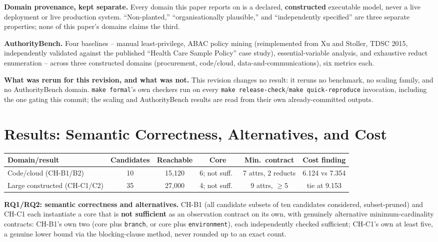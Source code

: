 \documentclass[11pt,a4paper]{article}
\theoremstyle{definition}
\begin{document}
\noindent\textbf{Domain provenance, kept separate.} Every domain this paper reports on is a declared, \textbf{constructed} executable model, never a live deployment or live production system. ``Non-planted,'' ``organisationally plausible,'' and ``independently specified'' are three separate properties; none of this paper's domains claims the third.

\noindent\textbf{AuthorityBench.} Four baselines -- manual least-privilege, ABAC policy mining (reimplemented from Xu and Stoller, TDSC 2015, independently validated against the published ``Health Care Sample Policy'' case study), essential-variable analysis, and exhaustive reduct enumeration -- across three constructed domains (procurement, code/cloud, data-and-communications), six metrics each.

\noindent\textbf{What was rerun for this revision, and what was not.} This revision changes no result: it reruns no benchmark, no scaling family, and no AuthorityBench domain. \texttt{make formal}'s own checkers run on every \texttt{make release-check}/\texttt{make quick-reproduce} invocation, including the one gating this commit; the scaling and AuthorityBench results are read from their own already-committed outputs.

\section{Results: Semantic Correctness, Alternatives, and Cost}
\label{sec:results}

\begin{center}
\footnotesize
\setlength{\tabcolsep}{4pt}
\begin{tabular}{lccccc}
\toprule
Domain/result & Candidates & Reachable & Core & Min.\ contract & Cost finding \\
\midrule
Code/cloud (CH-B1/B2) & 10 & 15{,}120 & 6; not suff.\ & 7 attrs, 2 reducts & 6.124 vs 7.354 \\
Large constructed (CH-C1/C2) & 35 & 27{,}000 & 4; not suff.\ & 9 attrs, $\geq$5 & tie at 9.153 \\
\bottomrule
\end{tabular}
\end{center}

\noindent\textbf{RQ1/RQ2: semantic correctness and alternatives.} CH-B1 (all candidate subsets of ten candidates considered, subset-pruned) and CH-C1 each instantiate a core that is \textbf{not sufficient} as an observation contract on its own, with genuinely alternative minimum-cardinality contracts: CH-B1's own two (core plus \texttt{branch}, or core plus \texttt{environment}), each independently checked sufficient; CH-C1's own at least five, a genuine lower bound via the blocking-clause method, never rounded up to an exact count.
\end{document}

